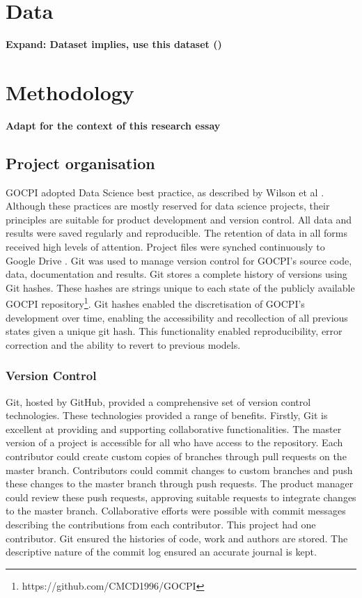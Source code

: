 \documentclass[12pt]{article}
\begin{document}
\section{Data}
\textbf{Expand: Dataset implies, use this dataset (\cite{jensen2021there})}

\section{Methodology}
\textbf{Adapt for the context of this research essay}
\subsection{Project organisation}
GOCPI adopted Data Science best practice, as described by Wilson et al \cite{J:10}. Although these practices are
mostly reserved for data science projects, their principles are suitable for product development and version control. All data and
results were saved regularly and reproducible. The retention of data in all forms received high levels of attention. Project files were synched
continuously to Google Drive \cite{Google_Drive}. Git \cite{Git} was used to manage version control for GOCPI's source code, data, documentation and results.
Git stores a complete history of versions using Git hashes. These hashes are strings unique to each state of the
publicly available GOCPI repository\footnote[1]{https://github.com/CMCD1996/GOCPI}. Git hashes enabled the discretisation of GOCPI's development over time,
enabling the accessibility and recollection of all previous states given a unique git hash. This functionality
enabled reproducibility, error correction and the ability to revert to previous models.

\subsubsection{Version Control}\label{Version Control}
Git, hosted by GitHub, provided a comprehensive set of version control technologies. These technologies provided a range of benefits.
Firstly, Git is excellent at providing and supporting collaborative functionalities. The master version of a project is accessible for all
who have access to the repository. Each contributor could create custom copies of branches through pull requests on the master branch. Contributors
could commit changes to custom branches and push these changes to the master branch through push requests. The product manager could review these push requests,
approving suitable requests to integrate changes to the master branch. Collaborative efforts were possible with
commit messages describing the contributions from each contributor. This project had one contributor. Git ensured the histories of code, work and authors are stored.
The descriptive nature of the commit log ensured an accurate journal is kept.
\end{document}
